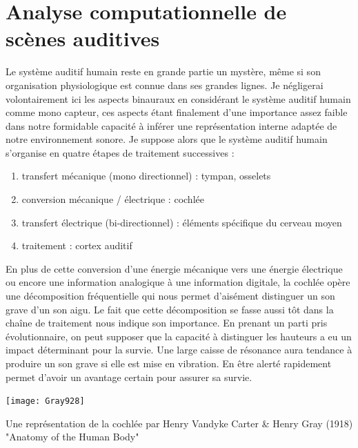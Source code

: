 
\section{\nmu Analyse computationnelle de scènes auditives} \label{sec:asa}

Le système auditif humain reste en grande partie un mystère, même si son organisation physiologique est connue dans ses grandes lignes. Je négligerai volontairement ici les aspects binauraux en considérant le système auditif humain comme mono capteur, ces aspects étant finalement d'une importance assez faible dans notre formidable capacité à inférer une représentation interne adaptée de notre environnement sonore. Je suppose alors que le système auditif humain s'organise en quatre étapes de traitement successives :
\begin{enumerate}
  \item transfert mécanique (mono directionnel) : tympan, osselets
  \item conversion mécanique / électrique : cochlée
  \item transfert électrique (bi-directionnel) : éléments spécifique du cerveau moyen
  \item traitement : cortex auditif
\end{enumerate}

En plus de cette conversion d'une énergie mécanique vers une énergie électrique ou encore une information analogique à une information digitale, la cochlée opère une décomposition fréquentielle qui nous permet d'aisément distinguer un son grave d'un son aigu. Le fait que cette décomposition se fasse aussi tôt dans la chaîne de traitement nous indique son importance. En prenant un parti pris évolutionnaire, on peut supposer que la capacité à distinguer les hauteurs a eu un impact déterminant pour la survie. Une large caisse de résonance aura tendance à produire un son grave si elle est mise en vibration. En être alerté rapidement permet d'avoir un avantage certain pour assurer sa survie.

\begin{marginfigure}
  \texttt{[image: Gray928]}
  \caption{Une représentation de la cochlée par Henry Vandyke Carter \& Henry Gray (1918) "Anatomy of the Human Body"} %
\end{marginfigure}

